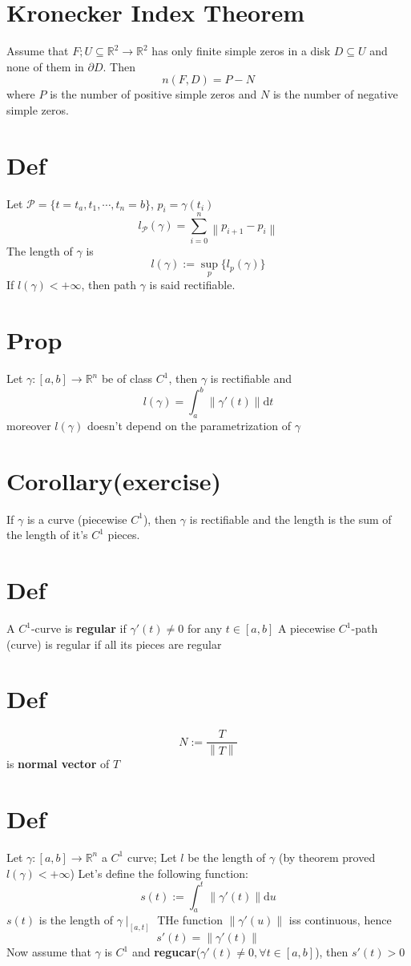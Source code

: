 \documentclass{article}
\newcommand{\norm}[1]{\left\lVert #1 \right\rVert}
\begin{document}
\section{Kronecker Index Theorem}
Assume that $F;U\subseteq \mathbb{R}^2\rightarrow\mathbb{R}^2$ has only finite simple zeros in a disk $D\subseteq U$ and none of them in $\partial D$. Then
$$n(F,D)=P-N$$
where $P$ is the number of positive simple zeros and $N$ is the number of negative simple zeros.
\section{Def}
Let $\mathcal{P}=\{t=t_a,t_1,\cdots,t_n=b\}$, $p_i=\gamma(t_i)$
$$l_{\mathcal{P}}(\gamma)=\sum\limits_{i=0}^n\norm{p_{i+1}-p_i}$$
The length of $\gamma$ is 
$$l(\gamma):=\sup\limits_p\{l_p(\gamma)\}$$
If $l(\gamma)<+\infty$, then path $\gamma$ is said rectifiable.
\section{Prop}
Let $\gamma:[a,b]\rightarrow\mathbb{R}^n$ be of class $C^1$, then $\gamma$ is rectifiable and $$l(\gamma)=\int_a^b\norm{\gamma'(t)}\text{d}t$$
moreover $l(\gamma)$ doesn't depend on the parametrization of $\gamma$
\section{Corollary(exercise)}
If $\gamma$ is a curve (piecewise $C^1$), then $\gamma$ is rectifiable and the length is the sum of the length of it's $C^1$ pieces.
\section{Def}
A $C^1$-curve is \textbf{regular} if $\gamma'(t)\neq0$ for any $t\in [a,b]$ A piecewise $C^1$-path (curve) is regular if all its pieces are regular



\section{Def}
$$N:=\frac{T}{\norm{T}}$$ is \textbf{normal vector} of $T$
\section{Def}
Let $\gamma:[a,b]\rightarrow\mathbb{R}^n$ a $C^1$ curve; Let $l$ be the length of $\gamma$ (by theorem proved $l(\gamma)<+\infty$) Let's define the following function:
$$s(t):=\int_a^t\norm{\gamma'(t)}\text{d}u$$
$s(t)$ is the length of $\gamma\mid_{[a,t]}$
THe function $\norm{\gamma'(u)}$ iss continuous, hence
$$s'(t)=\norm{\gamma'(t)}$$
Now assume that $\gamma$ is $C^1$ and \textbf{regucar}($\gamma'(t)\neq0,\forall t\in [a,b]$), then $s'(t)>0$
\end{document}
